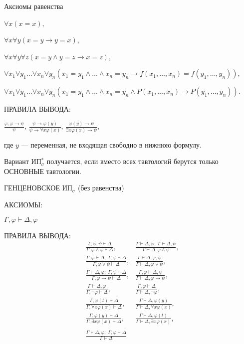 \documentclass[a4paper,11pt]{article}
\begin{document}
Аксиомы равенства 

$\forall x (x = x)$, 

$\forall x \forall y(x = y
\rightarrow y = x)$, 

$\forall x \forall y\forall z (x = y \land y
= z \rightarrow x = z)$, 
\medskip

$\forall x_1 \forall y_1\ldots \forall
x_n \forall y_n (x_1 = y_1 \land \ldots \land x_n = y_n
\rightarrow f(x_1,\ldots,x_n) = f(y_1,\ldots, y_n))$, 
\medskip

$\forall x_1
\forall y_1\ldots\forall x_n \forall y_n (x_1 = y_1 \land \ldots
\land x_n = y_n \land P(x_1,\ldots, x_n) \rightarrow
P(y_1,\ldots, y_n))$.
\medskip

ПРАВИЛА ВЫВОДА:
\medskip

$\frac{\varphi,\varphi\rightarrow\psi}{\psi}$,\;\;\;
$\frac{\psi\rightarrow \varphi(y)}{\psi\rightarrow\forall
x\varphi(x)}$, \;\;\;
$\frac{\varphi(y)\rightarrow\psi}{\exists
x\varphi(x)\rightarrow\psi}$, 
\medskip

где $y$ --- переменная, не входящая свободно в нижнюю формулу.
\medskip

Вариант ИП$^*_\sigma$ получается, если вместо всех тавтологий берутся только ОСНОВНЫЕ тавтологии.

\pagebreak


ГЕНЦЕНОВСКОЕ  ИП$_\sigma$ (без равенства)

АКСИОМЫ: 
\medskip

$\Gamma,\varphi\vdash \Delta,\varphi$

\medskip


ПРАВИЛА ВЫВОДА:
\medskip
\begin{align*}
&\frac{\Gamma,\varphi,\psi\vdash\Delta}{\Gamma,\varphi\land\psi\vdash\Delta},&
\frac{\Gamma\vdash\Delta,\varphi;\;\Gamma\vdash\Delta,\psi}{\Gamma\vdash\Delta,\varphi\land\psi},
\\
&\frac{\Gamma,\varphi\vdash\Delta;\;\Gamma,\psi\vdash\Delta}{\Gamma,\varphi\lor\psi\vdash\Delta},&
\frac{\Gamma\vdash\Delta,\varphi,\psi}{\Gamma\vdash\Delta,\varphi\lor\psi},
\\
&\frac{\Gamma\vdash\Delta,\varphi;\;\Gamma,\psi\vdash\Delta}{\Gamma,\varphi\rightarrow\psi\vdash\Delta},&
\frac{\Gamma,\varphi\vdash\Delta,\psi}{\Gamma\vdash\Delta,\varphi\rightarrow\psi},
\\
&\frac{\Gamma\vdash\Delta,\varphi}{\Gamma,\neg\varphi\vdash\Delta},&
\frac{\Gamma,\varphi\vdash\Delta}{\Gamma\vdash\Delta,\neg\varphi},
\\
&\frac{\Gamma,\varphi(t)\vdash\Delta}{\Gamma,\forall x\varphi(x)\vdash\Delta}, &
\frac{\Gamma\vdash\Delta,\varphi(y)}{\Gamma\vdash\Delta,\forall x\varphi(x)},
\\
&\frac{\Gamma,\varphi(y)\vdash\Delta}{\Gamma,\exists x\varphi(x)\vdash\Delta}, &
\frac{\Gamma\vdash\Delta,\varphi(t)}{\Gamma\vdash\Delta,\exists x\varphi(x)},
\\\\
&\frac{\Gamma\vdash\Delta,\varphi;\;\Gamma,\varphi\vdash\Delta}{\Gamma\vdash\Delta}
\end{align*}
\end{document}
